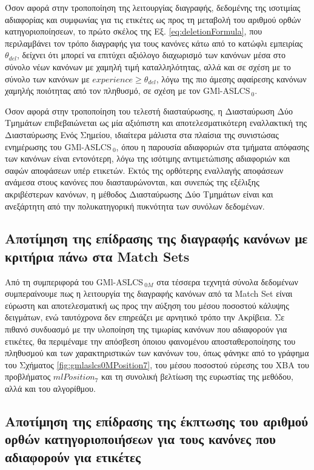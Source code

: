 Όσον αφορά στην τροποποίηση της λειτουργίας διαγραφής, δεδομένης της ισοτιμίας αδιαφορίας και συμφωνίας για τις ετικέτες ως προς τη μεταβολή του αριθμού ορθών κατηγοριοποίησεων, το πρώτο σκέλος της Εξ. \ref{eq:deletionFormula}, που περιλαμβάνει τον τρόπο διαγραφής για τους κανόνες κάτω από το κατώφλι εμπειρίας $\theta_{del}$, δείχνει ότι μπορεί να επιτύχει αξιόλογο διαχωρισμό των κανόνων μέσα στο σύνολο νέων κανόνων με χαμηλή τιμή καταλληλότητας, αλλά και σε σχέση με το σύνολο των κανόνων με $experience \geq \theta_{del}$, λόγω της πιο άμεσης αφαίρεσης κανόνων χαμηλής ποιότητας από τον πληθυσμό, σε σχέση με τον GMl-ASLCS$_{\:0}$.

Όσον αφορά στην τροποποίηση του τελεστή διασταύρωσης, η Διασταύρωση Δύο Τμημάτων επιβεβαιώνεται ως μία αξιόπιστη και αποτελεσματικότερη εναλλακτική της Διασταύρωσης Ενός Σημείου, ιδιαίτερα μάλιστα στα πλαίσια της συνιστώσας ενημέρωσης του GMl-ASLCS$_{\:0}$, όπου η παρουσία αδιαφοριών στα τμήματα απόφασης των κανόνων είναι εντονότερη, λόγω της ισότιμης αντιμετώπισης αδιαφοριών και σαφών αποφάσεων υπέρ ετικετών. Εκτός της ορθότερης εναλλαγής αποφάσεων ανάμεσα στους κανόνες που διασταυρώνονται, και συνεπώς της εξέλιξης ακριβέστερων κανόνων, η μέθοδος Διασταύρωσης Δύο Τμημάτων είναι και ανεξάρτητη από την πολυκατηγορική πυκνότητα των συνόλων δεδομένων.


 
\subsection{Αποτίμηση της επίδρασης της διαγραφής κανόνων με κριτήρια πάνω στα Match Sets}
Από τη συμπεριφορά του GMl-ASLCS$_{\:0M}$ στα τέσσερα τεχνητά σύνολα δεδομένων συμπεραίνουμε πως η λειτουργία της διαγραφής κανόνων από τα Match Set είναι εύρωστη και αποτελεσματική ως προς την αύξηση του μέσου ποσοστού κάλυψης δειγμάτων, ενώ ταυτόχρονα δεν επηρεάζει με αρνητικό τρόπο την Ακρίβεια. Σε πιθανό συνδυασμό με την υλοποίηση της τιμωρίας κανόνων που αδιαφορούν για ετικέτες, θα περιμέναμε την απόσβεση όποιου φαινομένου αποσταθεροποίησης του πληθυσμού και των χαρακτηριστικών των κανόνων του, όπως φάνηκε από το γράφημα του Σχήματος \ref{fig:gmlaslcs0MPosition7}, του μέσου ποσοστού εύρεσης του ΧΒΑ του προβλήματος $mlPosition_{7}$ και τη συνολική βελτίωση της ευρωστίας της μεθόδου, αλλά και του αλγορίθμου.

\subsection{Αποτίμηση της επίδρασης της έκπτωσης του αριθμού ορθών κατηγοριοποιήσεων για τους κανόνες που αδιαφορούν για ετικέτες}

